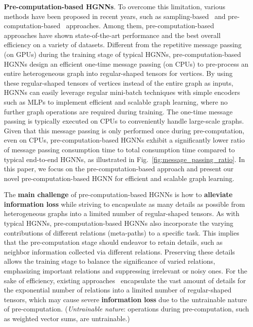 \documentclass[lettersize,journal]{IEEEtran}
\begin{document}
\textbf{Pre-computation-based HGNNs}.
To overcome this limitation, various methods have been proposed in recent years, such as sampling-based~\cite{DBLP:conf/nips/HamiltonYL17,DBLP:conf/iclr/ChenMX18,DBLP:conf/iclr/ZengZSKP20,DBLP:conf/nips/Huang0RH18} and pre-computation-based~\cite{yu2020scalable,yang2022simple} approaches. 
Among them, pre-computation-based approaches have shown state-of-the-art performance and the best overall efficiency on a variety of datasets.
Different from the repetitive message passing (on GPUs) during the training stage of typical HGNNs, pre-computation-based HGNNs design an efficient one-time message passing (on CPUs) to pre-process an entire heterogeneous graph into regular-shaped tensors for vertices. 
By using these regular-shaped tensors of vertices instead of the entire graph as inputs, HGNNs can easily leverage regular mini-batch techniques with simple encoders such as MLPs to implement efficient and scalable graph learning, where no further graph operations are required during training. 
The one-time message passing is typically executed on CPUs to conveniently handle large-scale graphs. 
Given that this message passing is only performed once during pre-computation, even on CPUs, pre-computation-based HGNNs exhibit a significantly lower ratio of message passing consumption time to total consumption time compared to typical end-to-end HGNNs, as illustrated in Fig.~\ref{fig:message_passing_ratio}.
In this paper, we focus on the pre-computation-based approach and present our novel pre-computation-based HGNN for efficient and scalable graph learning.












The \textbf{main challenge} of pre-computation-based HGNNs is how to \textbf{alleviate information loss} while striving to encapsulate as many details as possible from heterogeneous graphs into a limited number of regular-shaped tensors.
As with typical HGNNs, pre-computation-based HGNNs also incorporate the varying contributions of different relations (meta-paths) to a specific task.
This implies that the pre-computation stage should endeavor to retain details, such as neighbor information collected via different relations.
Preserving these details allows the training stage to balance the significance of varied relations, emphasizing important relations and suppressing irrelevant or noisy ones.
For the sake of efficiency, existing approaches~\cite{yu2020scalable} encapsulate the vast amount of details for the exponential number of relations into a limited number of regular-shaped tensors, which may cause severe \textbf{information loss} due to the untrainable nature of pre-computation.
(\textit{Untrainable nature}: operations during pre-computation, such as weighted vector sums, are untrainable.)
\end{document}
